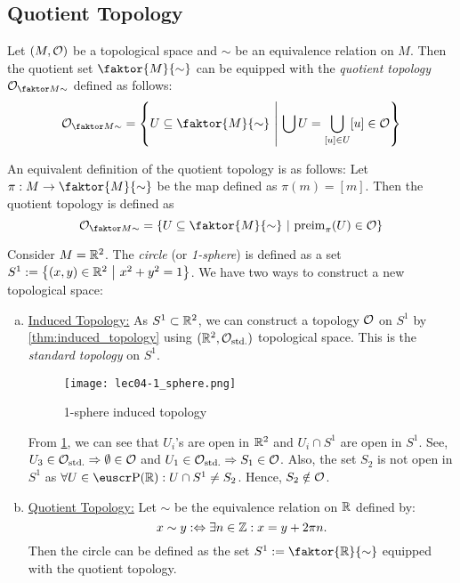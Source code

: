 \subsection{Quotient Topology}
\begin{definition}\label{def:quotient_topology}
	Let \((M, \mathcal{O})\) be a topological space and \(\sim\) be an equivalence relation on \(M\). Then the quotient set \(\faktor{M}{\sim}\) can be equipped with the \emph{quotient topology} \(\Oq{M}\) defined as follows:
	\begin{equation}
		\Oq{M} = \qty{U \subseteq \faktor{M}{\sim} \mid \bigcup U = \bigcup_{[u] \in U} [u] \in \O} \label{eq:quotient_topology}
	\end{equation}
\end{definition}
An equivalent definition of the quotient topology is as follows: Let \(\pi: M \to \faktor{M}{\sim}\) be the map defined as \(\pi(m) = [m]\). Then the quotient topology is defined as
\begin{equation}
	\Oq{M} = \qty{U \subseteq \faktor{M}{\sim} \mid \preimg_{\pi}(U) \in \O} \label{eq:quotient_topology_map}
\end{equation}

\begin{example}
	Consider \(M = \mathbb R^2\). The \emph{circle} (or \emph{1-sphere}) is defined as a set \(S^1 := \qty{(x, y) \in \mathbb R^2 \ \middle|\ x^2 + y^2 = 1}\). We have two ways to construct a new topological space:
	\begin{enumerate}[(a)]
		\item \uline{Induced Topology:} As \(S^1 \subset \mathbb R^2\), we can construct a topology \(\mathcal{O}\) on \(S^1\) by \cref{thm:induced_topology} using \((\mathbb R^2, \mathcal{O}_{\text{std.}})\) topological space. This is the \emph{standard topology} on \(S^1\).
		      \begin{figure}[H]
			      \centering
			      \texttt{[image: lec04-1\_sphere.png]}
			      \caption{1-sphere induced topology}
			      \label{fig:1-sphere_induced_topology}
		      \end{figure} \noindent
		      From \cref{fig:1-sphere_induced_topology}, we can see that \(U_i\)'s are open in \(\mathbb R^2\) and \(U_i \cap S^1\) are open in \(S^1\). See, \(U_3 \in \mathcal{O}_{\text{std.}} \Rightarrow \emptyset \in \mathcal{O}\) and \(U_1 \in \mathcal{O}_{\text{std.}} \Rightarrow S_1 \in \mathcal{O}\). Also, the set \(S_2\) is not open in \(S^1\) as \(\forall U \in \powerset(\R): U \cap S^1 \neq S_2\). Hence, \(S_2 \notin \mathcal{O}\).

		\item \uline{Quotient Topology:} Let $\sim$ be the equivalence relation on $\mathbb R$ defined by:
		      \begin{equation*}
			      x \sim y :\Leftrightarrow \exists n \in \mathbb Z : x = y + 2 \pi n.
		      \end{equation*}
		      Then the circle can be defined as the set $S^1 := \faktor{\R}{\sim}$ equipped with the quotient topology.
	\end{enumerate}
\end{example}

